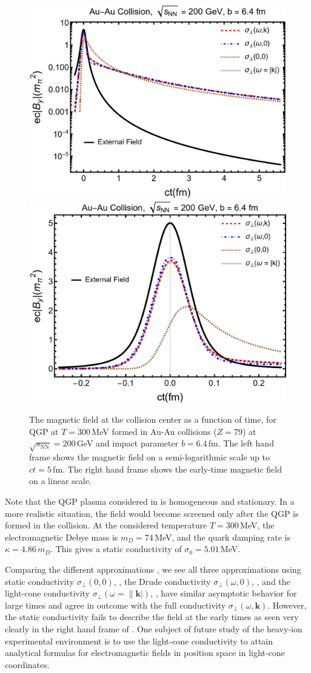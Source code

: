 \begin{figure}
\includegraphics[width=0.50\linewidth]{plots/bf100.png}
\includegraphics[width=0.47\linewidth]{plots/bf100lin.png}
\caption{The magnetic field at the collision center as a function of time, for QGP at $T = 300$\,MeV formed in Au-Au collisions ($Z=79$) at $\sqrt{s_\text{NN}} = 200$\,GeV and impact parameter $b = 6.4\,$fm. The left hand frame shows the magnetic field on a semi-logarithmic scale up to $ct = 5$\,fm. The right hand frame shows the early-time magnetic field on a linear scale. \label{fig:bfcomp}}
\end{figure}

Note that the QGP plasma considered in  is homogeneous and stationary. In a more realistic situation, the field would become screened only after the QGP is formed in the collision. At the considered temperature $T = 300$\,MeV, the electromagnetic Debye mass is $m_D = 74\,$MeV, and the quark damping rate is $\kappa = 4.86\,m_D$. This gives a static conductivity of $\sigma_0 = 5.01\,$MeV. 

Comparing the different approximations   , we see  all three approximations using static conductivity $\sigma_\bot(0,0)$, , the Drude conductivity $\sigma_\bot(\omega,0)$, ,  and the light-cone conductivity $\sigma_\bot(\omega=\|\boldsymbol{k}|)$, ,  have similar asymptotic behavior for large times and agree in outcome with the full conductivity $\sigma_\perp(\omega,\boldsymbol{k})$. However, the static conductivity fails to describe the field at the early times as seen very clearly in the right hand frame of . One subject of future study of the heavy-ion experimental environment is to use the light-cone conductivity to attain analytical formulas for electromagnetic fields in position space in light-cone coordinates.

